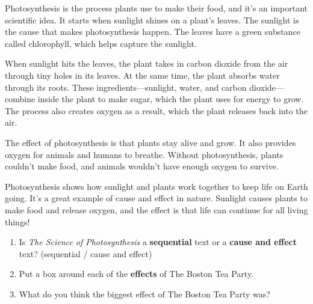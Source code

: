 \documentclass[12pt]{article}
\begin{document}
\begin{tcolorbox}[colframe=black!60, colback=white, 
coltitle=black, colbacktitle=black!15, fonttitle=\bfseries\Large, 
title=Text 4: The Science of Photosynthesis, halign title=center, left=10pt, right=10pt, top=10pt, bottom=15pt]
Photosynthesis is the process plants use to make their food, and it’s an important scientific idea. It starts when sunlight shines on a plant's leaves. The sunlight is the cause that makes photosynthesis happen. The leaves have a green substance called chlorophyll, which helps capture the sunlight.

When sunlight hits the leaves, the plant takes in carbon dioxide from the air through tiny holes in its leaves. At the same time, the plant absorbs water through its roots. These ingredients—sunlight, water, and carbon dioxide—combine inside the plant to make sugar, which the plant uses for energy to grow. The process also creates oxygen as a result, which the plant releases back into the air.

The effect of photosynthesis is that plants stay alive and grow. It also provides oxygen for animals and humans to breathe. Without photosynthesis, plants couldn’t make food, and animals wouldn’t have enough oxygen to survive.

Photosynthesis shows how sunlight and plants work together to keep life on Earth going. It’s a great example of cause and effect in nature. Sunlight causes plants to make food and release oxygen, and the effect is that life can continue for all living things!




     \end{tcolorbox}
\begin{tcolorbox}[colframe=black!60, colback=white, 
coltitle=black, colbacktitle=black!15, fonttitle=\bfseries\Large, 
title=Independent Practice, halign title=center, left=10pt, right=10pt, top=10pt, bottom=15pt]

  \begin{enumerate}[itemsep=4em] %
    \item Is \textit{The Science of Photosynthesis} a \textbf{sequential} text or a \textbf{cause and effect} text? (sequential / cause and effect)
    \item Put a box around each of the \textbf{effects} of The Boston Tea Party.
    \item What do you think the biggest effect of The Boston Tea Party was?
\\[0.8cm] \underline{\hspace{15cm}}  
    \\[0.8cm] \underline{\hspace{15cm}}  
    \\[0.8cm] \underline{\hspace{15cm}}  
\end{enumerate} 


\end{tcolorbox}
\end{document}
